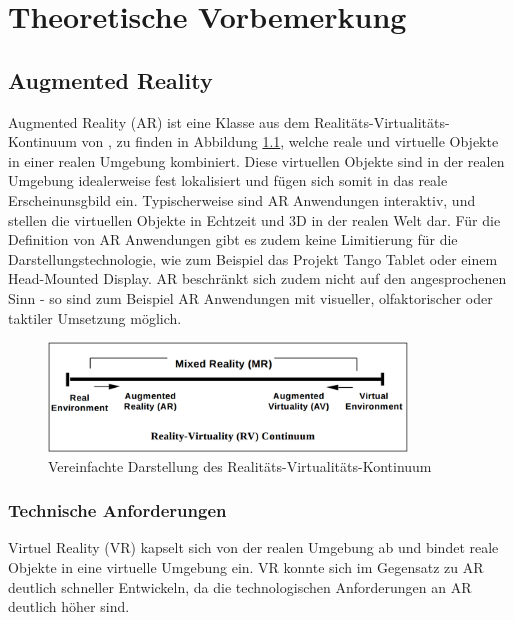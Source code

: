 \chapter{Theoretische Vorbemerkung}

\section{Augmented Reality}

Augmented Reality (AR) ist eine Klasse aus dem Realitäts-Virtualitäts-Kontinuum von \cite{milgram1995augmented}, zu finden in Abbildung \ref{fig:virtual-continuum}, welche reale und virtuelle Objekte in einer realen Umgebung kombiniert. Diese virtuellen Objekte sind in der realen Umgebung idealerweise fest lokalisiert und fügen sich somit in das reale Erscheinunsgbild ein. Typischerweise sind AR Anwendungen interaktiv, und stellen die virtuellen Objekte in Echtzeit und 3D in der realen Welt dar. Für die Definition von AR Anwendungen gibt es zudem keine Limitierung für die Darstellungstechnologie, wie zum Beispiel das Projekt Tango Tablet oder einem Head-Mounted Display. AR beschränkt sich zudem nicht auf den angesprochenen Sinn - so sind zum Beispiel AR Anwendungen mit visueller, olfaktorischer oder taktiler Umsetzung möglich. \citep{van2010survey}

\begin{figure}
  \centering
	\includegraphics[width=0.85\textwidth]{content/images/virtual-continuum.png} 
  \caption{Vereinfachte Darstellung des Realitäts-Virtualitäts-Kontinuum \citep{milgram1995augmented}}
  \label{fig:virtual-continuum}
\end{figure}

\subsection{Technische Anforderungen}

Virtuel Reality (VR) kapselt sich von der realen Umgebung ab und bindet reale Objekte in eine virtuelle Umgebung ein. VR konnte sich im Gegensatz zu AR deutlich schneller Entwickeln, da die technologischen Anforderungen an AR deutlich höher sind.

